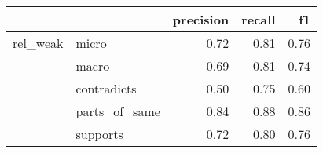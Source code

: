 \begin{tabular}{llrrr}
\toprule
         &          &  precision &  recall &   f1 \\
\midrule
rel\_weak & micro &       0.72 &    0.81 & 0.76 \\
         & macro &       0.69 &    0.81 & 0.74 \\
         & contradicts &       0.50 &    0.75 & 0.60 \\
         & parts\_of\_same &       0.84 &    0.88 & 0.86 \\
         & supports &       0.72 &    0.80 & 0.76 \\
\bottomrule
\end{tabular}
